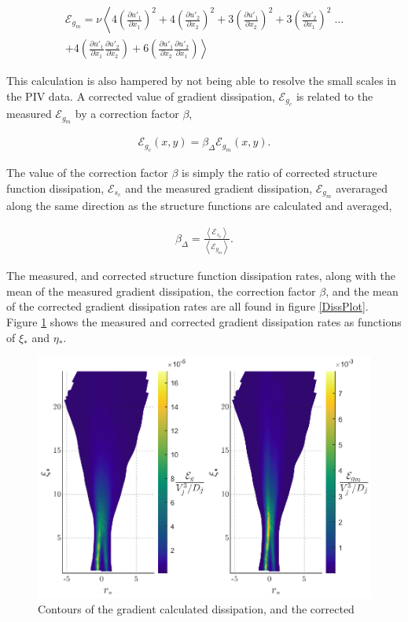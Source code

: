 \documentclass{article}
\newcommand\dsize[1]{\ensuremath{\mathcal{\scriptstyle {#1} } }} %
\newcommand\ensem[1]{\ensuremath{\left< {#1} \right>}} %
\newcommand\fpart[2]{\ensuremath{\frac{\partial {#1}}{\partial {#2} } }} %
\newcommand{\diss}{\dsize{E}}
\newcommand{\Deltait}{\mathit{\Delta}}
\newenvironment{myeq}   %
    {\begin{equation}
    \begin{gathered}
    }
    {
    \end{gathered}
    \end{equation}
    }
\begin{document}
\begin{myeq}
    \diss_{g_m} = \nu \left< 4\left( \fpart{u'_1}{x_1} \right)^2 + 4 \left( \fpart{u'_2}{x_2} \right)^2
        + 3 \left( \fpart{u'_1}{x_2} \right)^2 + 3 \left( \fpart{u'_2}{x_1} \right)^2 \right. \; \dots \\ 
        \left. + 4 \left( \fpart{u'_1}{x_1} \fpart{u'_2}{x_2} \right) + 6 \left( \fpart{u'_1}{x_2}
        \fpart{u'_2}{x_1} \right) \right>
    \label{localIso}
\end{myeq}

This calculation is also hampered by not being able to resolve the small scales in the PIV data. A corrected value of gradient dissipation, $\diss_{g_c}$ is related to the measured $\diss_{g_m}$ by a correction factor $\beta$,

\begin{myeq}
    \diss_{g_c}(x,y) = \beta_\Deltait \diss_{g_m}(x,y).
    \label{correctGrad}
\end{myeq}

The value of the correction factor $\beta$ is simply the ratio of corrected structure function dissipation, $\diss_{s_c}$ and the measured gradient dissipation, $\diss_{g_m}$ averaraged along the same direction as the structure functions are calculated and averaged, 

\begin{myeq}
    \beta_\Deltait = \frac{ \ensem{\diss_{s_c}} }{\ensem{\diss_{g_m}}}.
    \label{beta}
\end{myeq}


The measured, and corrected structure function dissipation rates, along with the mean of the measured gradient dissipation, the correction factor $\beta$, and the mean of the corrected gradient dissipation rates are all found in figure \ref{DissPlot}. Figure \ref{DissCont} shows the measured and corrected gradient dissipation rates as functions of $\xi_{*}$ and $\eta_{*}$.






\begin{figure}
    \centering
    \includegraphics[]{figs/PG_4Hz_diss_contours.eps}
    \caption{Contours of the gradient calculated dissipation, and the corrected}
    \label{DissCont}
\end{figure}
\end{document}
